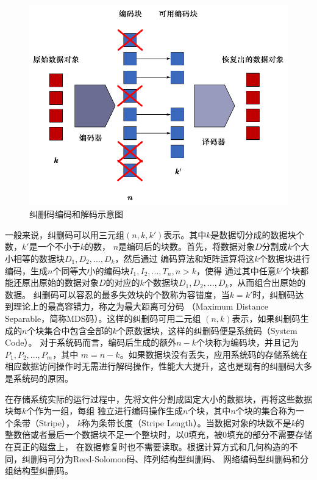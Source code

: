 \begin{figure}[htbp]
	\centering
	\includegraphics [scale=0.8]{figures/1.2.pdf}
	\caption{纠删码编码和解码示意图}
	\label{fig:con-1.2}
\end{figure}







一般来说，纠删码可以用三元组$(n,k,k')$表示。其中$k$是数据切分成的数据块个数，$k'$是一个不小于$k$的数，
$n$是编码后的块数。首先，将数据对象$D$分割成$k$个大小相等的数据块$D_1,D_2,...,D_k$，然后通过
编码算法和矩阵运算将这$k$个数据块进行编码，生成$n$个同等大小的编码块$I_1,I_2,...,T_n,n>k$，使得
通过其中任意$k'$个块都能还原出原始的数据对象$D$的对应的$k$个数据块$D_1,D_2,...,D_k$，从而组合出原始的数据。
纠删码可以容忍的最多失效块的个数称为容错度，当$k=k'$时，纠删码达到理论上的最高容错力，称之为最大距离可分码
（Maximum Distance Separable，简称MDS码）\cite{blaum1996mds}。这样的纠删码可用二元组
$(n,k)$表示，如果纠删码生成的$n$个块集合中包含全部的$k$个原数据块，这样的纠删码便是系统码（System Code）\cite{plank2009raid}。
对于系统码而言，编码后生成的额外$n-k$个块称为编码块，并且记为$P_1,P_2,...,P_m$，其中
$m=n-k$。如果数据块没有丢失，应用系统码的存储系统在相应数据访问操作时无需进行解码操作，性能大大提升，这也是现有的纠删码大多是系统码的原因。

在存储系统实际的运行过程中，先将文件分割成固定大小的数据块，再将这些数据块每$k$个作为一组，每组
独立进行编码操作生成$n$个块，其中$n$个块的集合称为一个条带（Stripe）\cite{hafner2005matrix}，
$k$称为条带长度（Stripe Length）。当数据对象的块数不是$k$的整数倍或者最后一个数据块不足一个整块时，以0填充，被0填充的部分不需要存储在真正的磁盘上，
在数据修复时也不需要读取。根据计算方式和几何构造的不同，纠删码可分为Reed-Solomon码、阵列结构型纠删码、
网络编码型纠删码和分组结构型纠删码。


